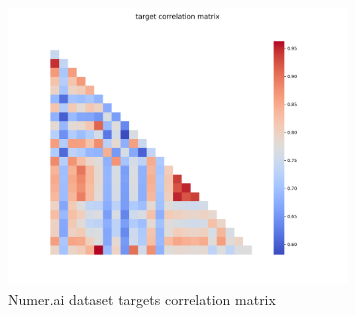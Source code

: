 \documentclass[12pt, a4paper]{article}
\begin{document}
\begin{figure}[!htpb]
    \centering
    \includegraphics[width=0.8\textwidth,trim={0 0 0 0},clip]{figures/target_correlations_matrix_2023-09-28.png}
    \caption[Numer.ai dataset targets correlation matrix]{Numer.ai dataset targets correlation matrix}
    \label{fig: numerai_targets_correlation_matrix}    
\end{figure}
\newpage
\end{document}
